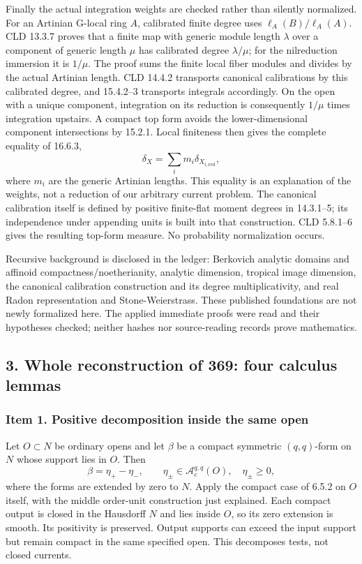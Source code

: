 \documentclass[11pt]{article}
\begin{document}
Finally the actual integration weights are checked rather than silently normalized. For an Artinian G-local ring \(A\), calibrated finite degree uses \(\ell_A(B)/\ell_A(A)\). CLD 13.3.7 proves that a finite map with generic module length \(\lambda\) over a component of generic length \(\mu\) has calibrated degree \(\lambda/\mu\); for the nilreduction immersion it is \(1/\mu\). The proof sums the finite local fiber modules and divides by the actual Artinian length. CLD 14.4.2 transports canonical calibrations by this calibrated degree, and 15.4.2--3 transports integrals accordingly. On the open with a unique component, integration on its reduction is consequently \(1/\mu\) times integration upstairs. A compact top form avoids the lower-dimensional component intersections by 15.2.1. Local finiteness then gives the complete equality of 16.6.3,
\[
 \delta_X=\sum_i m_i\delta_{X_{i,\mathrm{red}}},
\]
where \(m_i\) are the generic Artinian lengths. This equality is an explanation of the weights, not a reduction of our arbitrary current problem. The canonical calibration itself is defined by positive finite-flat moment degrees in 14.3.1--5; its independence under appending units is built into that construction. CLD 5.8.1--6 gives the resulting top-form measure. No probability normalization occurs.

Recursive background is disclosed in the ledger: Berkovich analytic domains and affinoid compactness/noetherianity, analytic dimension, tropical image dimension, the canonical calibration construction and its degree multiplicativity, and real Radon representation and Stone-Weierstrass. These published foundations are not newly formalized here. The applied immediate proofs were read and their hypotheses checked; neither hashes nor source-reading records prove mathematics.

\subsection{3. Whole reconstruction of 369: four calculus lemmas}

\subsubsection{Item 1. Positive decomposition inside the same open}

Let \(O\subset N\) be ordinary opens and let \(\beta\) be a compact symmetric \((q,q)\)-form on \(N\) whose support lies in \(O\). Then
\[
 \beta=\eta_+-\eta_-,\qquad
 \eta_\pm\in\mathcal A_c^{q,q}(O),\quad\eta_\pm\geq0,
\]
where the forms are extended by zero to \(N\). Apply the compact case of 6.5.2 on \(O\) itself, with the middle order-unit construction just explained. Each compact output is closed in the Hausdorff \(N\) and lies inside \(O\), so its zero extension is smooth. Its positivity is preserved. Output supports can exceed the input support but remain compact in the same specified open. This decomposes tests, not closed currents.
\end{document}
